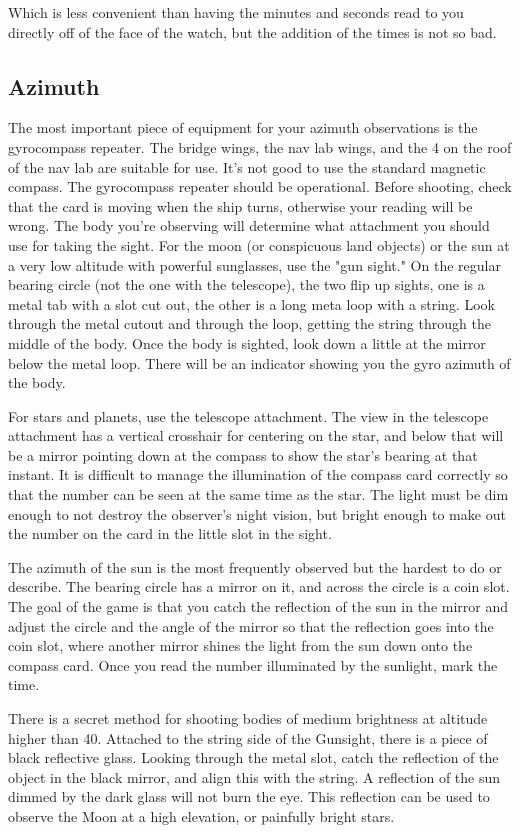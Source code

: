 \documentclass[letterpaper,12pt]{article}
\begin{document}
\bigskip

Which is less convenient than having the minutes and seconds read to you directly off of the face of the watch, but the addition of the times is not so bad.
\subsection{Azimuth}
The most important piece of equipment for your azimuth observations is the gyrocompass repeater. The bridge wings, the nav lab wings, and the 4 on the roof of the nav lab are suitable for use.
It's not good to use the standard magnetic compass.
The gyrocompass repeater should be operational.
Before shooting, check that the card is moving when the ship turns, otherwise your reading will be wrong.
The body you're observing will determine what attachment you should use for taking the sight.
For the moon (or conspicuous land objects) or the sun at a very low altitude with powerful sunglasses, use the "gun sight."
On the regular bearing circle (not the one with the telescope), the two flip up sights, one is a metal tab with a slot cut out, the other is a long meta loop with a string.
Look through the metal cutout and through the loop, getting the string through the middle of the body.
Once the body is sighted, look down a little at the mirror below the metal loop.
There will be an indicator showing you the gyro azimuth of the body.

For stars and planets, use the telescope attachment.
The view in the telescope attachment has a vertical crosshair for centering on the star, and below that will be a mirror pointing down at the compass to show the star's bearing at that instant.
It is difficult to manage the illumination of the compass card correctly so that the number can be seen at the same time as the star.
The light must be dim enough to not destroy the observer's night vision, but bright enough to make out the number on the card in the little slot in the sight.

The azimuth of the sun is the most frequently observed but the hardest to do or describe.
The bearing circle has a mirror on it, and across the circle is a coin slot.
The goal of the game is that you catch the reflection of the sun in the mirror and adjust the circle and the angle of the mirror so that the reflection goes into the coin slot, where another mirror shines the light from the sun down onto the compass card.
Once you read the number illuminated by the sunlight, mark the time.

There is a secret method for shooting bodies of medium brightness at altitude higher than 40\textdegree.
Attached to the string side of the Gunsight, there is a piece of black reflective glass.
Looking through the metal slot, catch the reflection of the object in the black mirror, and align this with the string.
A reflection of the sun dimmed by the dark glass will not burn the eye.
This reflection can be used to observe the Moon at a high elevation, or painfully bright stars.
\end{document}
